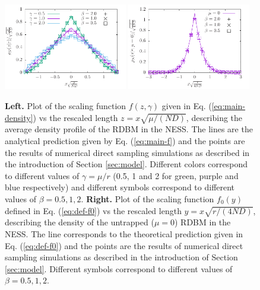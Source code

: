 \documentclass[onecolumn,superscriptaddress,
 amsmath,amssymb,
 aps,
 prd,
]{revtex4-1}
\begin{document}
{\begin{figure}[t]
\centering
\includegraphics[width=0.48\textwidth]{density.pdf} \hfill
\includegraphics[width=0.48\textwidth]{density0.pdf}
\caption{{\bf Left.} Plot of the scaling function $f(z, \gamma)$ given in Eq. (\ref{eq:main-density}) vs the rescaled length $z=x \sqrt{\mu/(ND)}$, describing the average density profile of the RDBM in the NESS. The lines are the analytical prediction given by Eq. (\ref{eq:main-f}) and the points are the results of numerical direct sampling simulations as described in the introduction of Section \ref{sec:model}. Different colors correspond to different values of $\gamma = \mu/r$ (0.5, 1 and 2 for green, purple and blue respectively) and different symbols correspond to different values of $\beta =  0.5, 1, 2$. {\bf Right.} Plot of the scaling function $f_0(y)$ defined in Eq. (\ref{eq:def-f0}) vs the rescaled length $y = x \sqrt{r/(4ND)}$, describing the density of the untrapped ($\mu = 0$) RDBM in the NESS. The line corresponds to the theoretical prediction given in Eq. (\ref{eq:def-f0}) and the points are the results of numerical direct sampling simulations as described in the introduction of Section \ref{sec:model}. Different symbols correspond to different values of $\beta = 0.5, 1, 2$.}\label{fig:density}
\end{figure}

}
\end{document}

